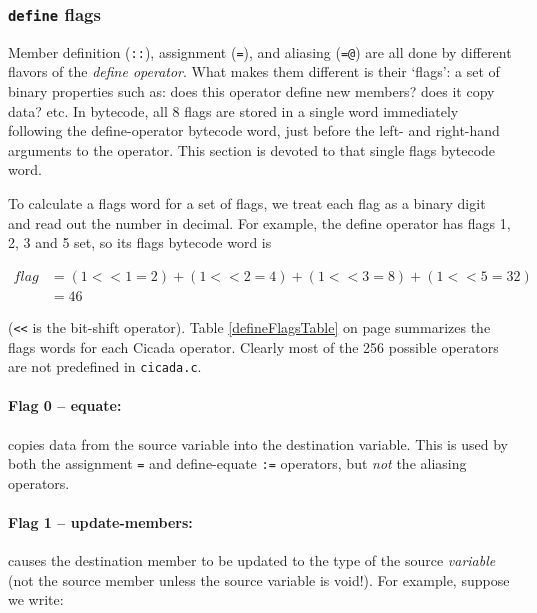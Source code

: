 \documentclass{article}
\begin{document}


\subsubsection{\texttt{define} flags} 

Member definition (\verb#::#), assignment (\verb#=#), and aliasing (\verb#=@#) are all done by different flavors of the \emph{define operator}.  What makes them different is their `flags':  a set of binary properties such as:  does this operator define new members? does it copy data? etc.  In bytecode, all 8 flags are stored in a single word immediately following the define-operator bytecode word, just before the left- and right-hand arguments to the operator.  This section is devoted to that single flags bytecode word.

To calculate a flags word for a set of flags, we treat each flag as a binary digit and read out the number in decimal.  For example, the define operator has flags 1, 2, 3 and 5 set, so its flags bytecode word is

\begin{align*}
flag &= (1 << 1 = 2) + (1 << 2 = 4) + (1 << 3 = 8) + (1 << 5 = 32)\\
&= 46
\end{align*}

\noindent (\verb#<<# is the bit-shift operator).  Table \ref{defineFlagsTable} on page \pageref{defineFlagsTable} summarizes the flags words for each Cicada operator.  Clearly most of the 256 possible operators are not predefined in \verb#cicada.c#.\\


\paragraph{Flag 0 -- equate:}  copies data from the source variable into the destination variable.  This is used by both the assignment \verb#=# and define-equate \verb#:=# operators, but \emph{not} the aliasing operators.\\


\paragraph{Flag 1 -- update-members:}  causes the destination member to be updated to the type of the source \emph{variable} (not the source member unless the source variable is void!).  For example, suppose we write:
\end{document}
